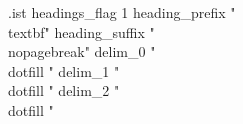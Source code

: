\makeatletter
\newcommand \indexdotfill {\leavevmode \cleaders \hb@xt@ .44em{\hss .\hss }\hfill \kern \z@}
\makeatother

\begin{filecontents*}{\jobname.ist}
  headings_flag 1
  heading_prefix "{\\textbf{"
  heading_suffix "}}\\nopagebreak\n"
  delim_0 " \\dotfill "
  delim_1 " \\dotfill "
  delim_2 " \\dotfill "
\end{filecontents*}

\newcommand{\printindices}
{
  \printindex
  \printindex[region]
  \printindex[ingredient]
}
